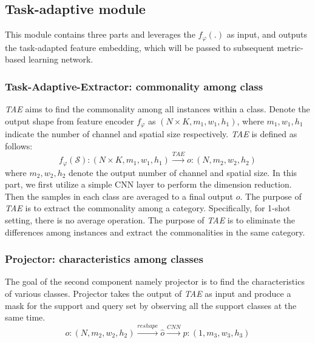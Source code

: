 \documentclass[a4paper]{article}
\begin{document}
\vspace{-1.5mm}
\subsection{Task-adaptive module}
This module contains three parts and leverages the $f_{\varphi}(.)$ as input, and outputs the task-adapted feature embedding, which will be passed to subsequent metric-based learning network.
\vspace{-1mm}
\subsubsection{Task-Adaptive-Extractor: commonality among class}
\vspace{-1mm}
\textit{TAE} aims to find the commonality among all instances within a class. Denote the output shape from feature encoder $f_{\varphi}$ as $(N\times K, m_1, w_1, h_1)$, where $m_1, w_1, h_1$ indicate the number of channel and spatial size respectively. \textit{TAE} is defined as follows:
\vspace{-1.5mm}
\begin{equation}
f_{\varphi}(\mathcal{S}) : (N \times K, m_1, w_1, h_1) \stackrel{TAE}{\longrightarrow} o: (N, m_2, w_2, h_2)
\end{equation}
where $m_2, w_2, h_2$ denote the output number of channel and spatial size. In this part, we first utilize a simple CNN layer to perform the dimension reduction. Then the samples in each class are averaged to a final output $o$. The purpose of \textit{TAE} is to extract the commonality among a category. Specifically, for 1-shot setting, there is no average operation.
The purpose of \textit{TAE} is to eliminate the differences among instances and extract the commonalities in the same category.
\vspace{-1.5mm}
\subsubsection{Projector: characteristics among classes}
\vspace{-1mm}
The goal of the second component namely projector is to find the characteristics of various classes. Projector takes the output of \textit{TAE} as input and produce a mask for the support and query set by observing all the support classes at the same time.
\vspace{-1.5mm}
\begin{equation}
o: (N, m_2, w_2, h_2) \stackrel{reshape}{\longrightarrow} \hat{o} \stackrel{CNN}{\longrightarrow} p:(1, m_3, w_3, h_3)
\end{equation}
\end{document}
